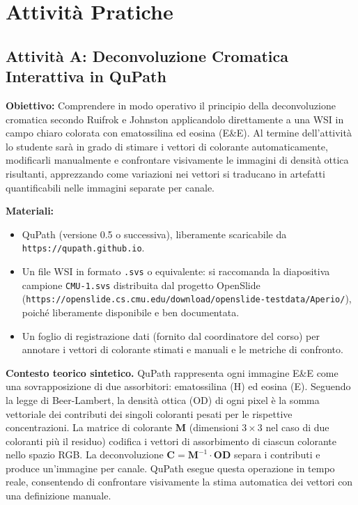 \section{Attività Pratiche}
\label{sec:ch2-practical}


\subsection{Attività A: Deconvoluzione Cromatica Interattiva in QuPath}

\textbf{Obiettivo:} Comprendere in modo operativo il principio della deconvoluzione cromatica
secondo Ruifrok e Johnston applicandolo direttamente a una WSI in campo chiaro colorata con
ematossilina ed eosina (E\&E). Al termine dell'attività lo studente sarà in grado di stimare i
vettori di colorante automaticamente, modificarli manualmente e confrontare visivamente le
immagini di densità ottica risultanti, apprezzando come variazioni nei vettori si traducano in
artefatti quantificabili nelle immagini separate per canale.

\textbf{Materiali:}
\begin{itemize}
    \item QuPath (versione 0.5 o successiva), liberamente scaricabile da
    \texttt{https://qupath.github.io}.
    \item Un file WSI in formato \texttt{.svs} o equivalente: si raccomanda la diapositiva
    campione \texttt{CMU-1.svs} distribuita dal progetto OpenSlide
    (\texttt{https://openslide.cs.cmu.edu/download/openslide-testdata/Aperio/}), poiché
    liberamente disponibile e ben documentata.
    \item Un foglio di registrazione dati (fornito dal coordinatore del corso) per annotare i
    vettori di colorante stimati e manuali e le metriche di confronto.
\end{itemize}

\medskip
\textbf{Contesto teorico sintetico.}
QuPath rappresenta ogni immagine E\&E come una sovrapposizione di due assorbitori: ematossilina
(H) ed eosina (E). Seguendo la legge di Beer-Lambert, la densità ottica (OD) di ogni pixel è la
somma vettoriale dei contributi dei singoli coloranti pesati per le rispettive concentrazioni.
La matrice di colorante $\mathbf{M}$ (dimensioni $3 \times 3$ nel caso di due coloranti più il
residuo) codifica i vettori di assorbimento di ciascun colorante nello spazio RGB. La
deconvoluzione $\mathbf{C} = \mathbf{M}^{-1} \cdot \mathbf{OD}$ separa i contributi e produce
un'immagine per canale. QuPath esegue questa operazione in tempo reale, consentendo di
confrontare visivamente la stima automatica dei vettori con una definizione manuale.

